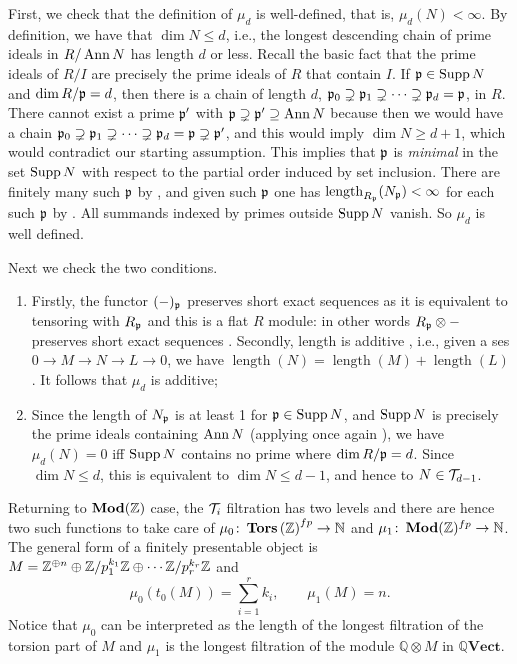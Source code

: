 \documentclass[runningheads]{llncs}
\begin{document}
\begin{proofE}
First, we check that the definition of $\mu_{d}$ is well-defined, that is, $\mu_d(N) < \infty$.
By definition, we have that $\dim N \leq d$, i.e., the longest descending chain of prime ideals in $R/\operatorname{Ann} N$ has length $d$ or less. 
Recall the basic fact that the prime ideals of $R/I$ are precisely the prime ideals of $R$ that contain $I.$ 
If $\mathfrak p \in \operatorname{Supp} N$ and $\dim R / \mathfrak p = d$, then there is a chain of length $d$, $\mathfrak p_0\supsetneq\mathfrak p_1\supsetneq\cdots\supsetneq\mathfrak p_d=\mathfrak p$, in $R$.
There cannot exist a prime $\mathfrak p'$ with $\mathfrak p\supsetneq\mathfrak p'\supseteq\operatorname{Ann} N$ because then we would have a chain $\mathfrak p_0 \supsetneq \mathfrak p_1 \supsetneq \cdots \supsetneq \mathfrak p_d=\mathfrak p\supsetneq\mathfrak p'$, and this would imply $\dim N \geq d+1$, which would contradict our starting assumption.
This implies that  $\mathfrak p$ is \emph{minimal} in the set $\operatorname{Supp} N$ with respect to the partial order induced by set inclusion. 
There are finitely many such $\mathfrak p$ by  \cite[Theorem 3.1]{eisenbud95}, and given such $\mathfrak p$ one has $\operatorname{length}_{R_\mathfrak p}(N_\mathfrak p) < \infty$ for each such $\mathfrak p$ by \cite[Corollary 2.18]{eisenbud95}. 
All summands indexed by primes outside $\operatorname{Supp} N$ vanish.
 So $\mu_d$ is well defined. 

Next we check the two conditions.
\begin{enumerate}
\item 
Firstly, the functor $(-)_\mathfrak p$ preserves short exact sequences as it is equivalent to tensoring with $R_\mathfrak p$ and this is a flat $R$ module: in other words $R_\mathfrak p\otimes -$ preserves short exact sequences \cite[Proposition 2.5]{eisenbud95}. 
Secondly, length is additive \cite[Lemma 10.52.3]{stacks-project}, i.e., given a ses  $0\to M\to N \to L \to 0$, we have $\operatorname{length}(N) = \operatorname{length}(M)+ \operatorname{length}(L)$. It follows that $\mu_d$ is additive;
\item
Since the length of $N_\mathfrak p$ is at least 1 for $\mathfrak p \in \operatorname{Supp} N$, and $\operatorname{Supp} N$ is precisely the prime ideals containing $\operatorname{Ann} N$ (applying once again \cite[Corollary 2.7]{eisenbud95}), we have $\mu_d (N) = 0$ iff $\operatorname{Supp} N$ contains no prime
where $\dim R/\mathfrak p=d$.
Since $\dim N \leq d$, this is equivalent to $\dim N \leq d-1$, and hence to $N \in \mathcal T_{d-1}$.
\end{enumerate}
\end{proofE}
\begin{example}
\label{ex:GKZMod}
Returning to $\operatorname{\mathbf{Mod}}(\mathbb{Z})$ case, the $\mathcal T_i$ filtration has two levels and there are hence two such functions to take care of $\mu_0 \colon \operatorname{\mathbf{Tors}}{(\mathbb{Z})} ^{fp}\to \mathbb N$ and $\mu_1 \colon \operatorname{\mathbf{Mod}}(\mathbb{Z})^{fp} \to \mathbb N$. 
The general form of a finitely presentable object is $M = \mathbb{Z}^{\oplus n} \oplus \mathbb{Z}/p_1^{k_1}\mathbb{Z} \oplus \cdots \mathbb{Z}/p_r^{k_r}\mathbb{Z} $ and
\begin{equation*}
\mu_0(t_0(M))= \sum_{i=1}^r k_i, \qquad \mu_1(M) = n.
\end{equation*}
Notice that $\mu_0$ can be interpreted as the length of the longest filtration of the torsion part of $M$ and $\mu_1$ is the longest filtration of the module $\mathbb Q \otimes M$ in $\mathbb Q\mathbf{Vect}.$ 
\end{example}
\end{document}
